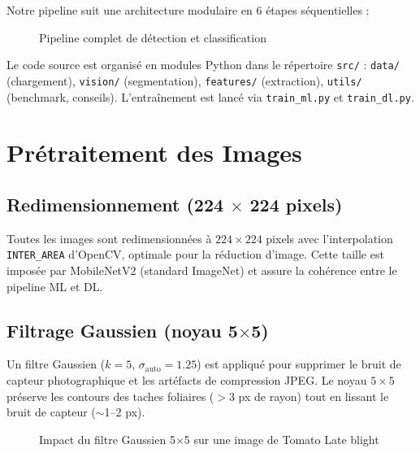 \documentclass[12pt,a4paper]{article}
\begin{document}
Notre pipeline suit une architecture modulaire en 6 étapes séquentielles :

\begin{figure}[H]
\centering
\caption{Pipeline complet de détection et classification}
\end{figure}

\noindent Le code source est organisé en modules Python dans le répertoire \texttt{src/} :
\texttt{data/} (chargement), \texttt{vision/} (segmentation), \texttt{features/} (extraction), 
\texttt{utils/} (benchmark, conseils). L'entraînement est lancé via \texttt{train\_ml.py} 
et \texttt{train\_dl.py}.

\section{Prétraitement des Images}

\subsection{Redimensionnement (224 $\times$ 224 pixels)}
Toutes les images sont redimensionnées à $224 \times 224$ pixels avec l'interpolation 
\texttt{INTER\_AREA} d'OpenCV, optimale pour la réduction d'image. Cette taille est imposée 
par MobileNetV2 (standard ImageNet) et assure la cohérence entre le pipeline ML et DL.

\subsection{Filtrage Gaussien (noyau 5$\times$5)}
Un filtre Gaussien ($k=5$, $\sigma_{\text{auto}}=1.25$) est appliqué pour supprimer le 
bruit de capteur photographique et les artéfacts de compression JPEG. Le noyau $5\times5$ 
préserve les contours des taches foliaires ($>$3 px de rayon) tout en lissant le bruit 
de capteur ($\sim$1--2 px).

\begin{figure}[H]
\centering
{}
\caption{Impact du filtre Gaussien 5$\times$5 sur une image de Tomato Late blight}
\end{figure}
\end{document}
